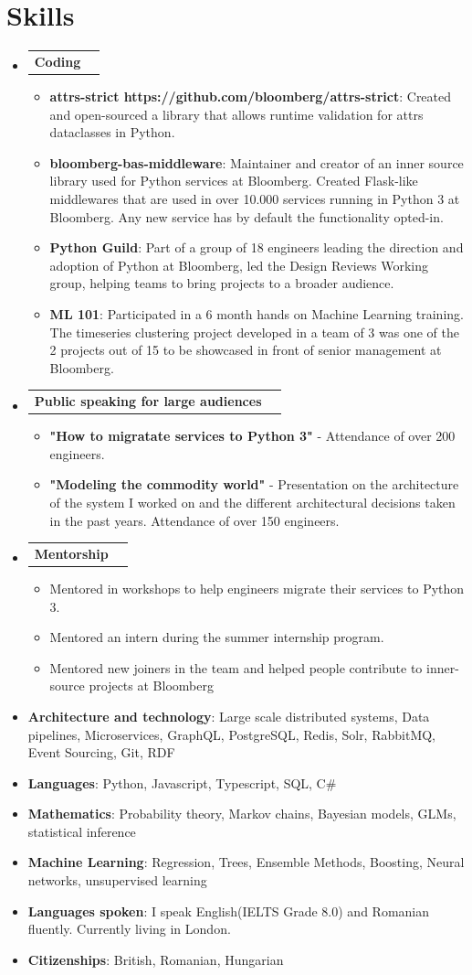 \documentclass[letterpaper,11pt]{article}
\makeatletter
\newcommand{\resumeItem}[2]{
  \item\small{
    \textbf{#1}{: #2 \vspace{-1pt}}
  }
}
\newcommand{\workItem}[2]{
  \item\small{
    \textbf{#1}{#2 \vspace{-0.6pt}}
  }
}
\newcommand{\resumeCoding}[1]{
  \vspace{-1pt}\item
    \begin{tabular*}{0.97\textwidth}{l@{\extracolsep{\fill}}r}
      \textbf{#1} \\      
    \end{tabular*}\vspace{-5pt}
}
\newcommand{\resumeSubHeadingListStart}{\begin{itemize}[leftmargin=*]}
\newcommand{\resumeSubHeadingListEnd}{\end{itemize}}
\newcommand{\resumeItemListStart}{\begin{itemize}}
\newcommand{\resumeItemListEnd}{\end{itemize}\vspace{-4.6pt}}
\makeatother
\begin{document}
\section{Skills}
 \resumeSubHeadingListStart
    \resumeCoding {Coding}
      \resumeItemListStart
        \resumeItem {attrs-strict https://github.com/bloomberg/attrs-strict}
        {Created and open-sourced a library that allows runtime validation for attrs dataclasses in Python.}
        \resumeItem {bloomberg-bas-middleware}
        {Maintainer and creator of an inner source library used for Python services at Bloomberg. Created Flask-like middlewares that are used in over 10.000 services running in Python 3 at Bloomberg. Any new service has by default the functionality opted-in.}
        \resumeItem {Python Guild}
        {Part of a group of 18 engineers leading the direction and adoption of Python at Bloomberg, led the Design Reviews Working group, helping teams to bring projects to a broader audience.}
        \resumeItem {ML 101}
        {Participated in a 6 month hands on Machine Learning training. The timeseries clustering project developed in a team of 3 was one of the 2 projects out of 15 to be showcased in front of senior management at Bloomberg.}  
      \resumeItemListEnd
    \resumeCoding {Public speaking for large audiences}
      \resumeItemListStart
        \workItem{}
        {\textbf{"How to migratate services to Python 3"} -  Attendance of over 200 engineers.}
        \workItem{}
        {\textbf{"Modeling the commodity world"} - Presentation on the architecture of the system I worked on and the different architectural decisions taken in the past years. Attendance of over 150 engineers.}
      \resumeItemListEnd
    \resumeCoding {Mentorship}
      \resumeItemListStart
        \workItem{}
        {Mentored in workshops to help engineers migrate their services to Python 3.}
        \workItem{}
        {Mentored an intern during the summer internship program.}
        \workItem{}
        {Mentored new joiners in the team and helped people contribute to inner-source projects at Bloomberg}
      \resumeItemListEnd
   \item{
     \textbf{Architecture and technology}{: Large scale distributed systems, Data pipelines, Microservices, GraphQL, PostgreSQL, Redis, Solr, RabbitMQ, Event Sourcing, Git, RDF}
   }
   \item{
     \textbf{Languages}{: Python, Javascript, Typescript, SQL, C\#}
   }
   \item{
     \textbf{Mathematics}{: Probability theory, Markov chains, Bayesian models, GLMs, statistical inference}
   }
   \item{
     \textbf{Machine Learning}{: Regression, Trees, Ensemble Methods, Boosting, Neural networks, unsupervised learning}
   }
   \item{
     \textbf{Languages spoken}{: I speak English(IELTS Grade 8.0) and Romanian fluently. Currently living in London.}
   }
  \item{
    \textbf{Citizenships}{: British, Romanian, Hungarian}
  }
 \resumeSubHeadingListEnd
\end{document}
